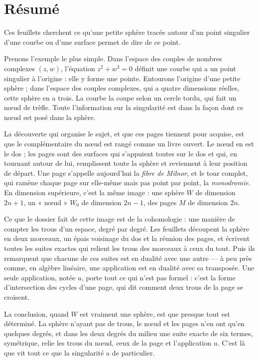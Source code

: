 \documentclass[11pt,a4paper]{article}
\begin{document}
\section*{Résumé}

\begin{resume}
Ces feuillets cherchent ce qu'une petite sphère tracée autour d'un point
singulier d'une courbe ou d'une surface permet de dire de ce point.

Prenons l'exemple le plus simple. Dans l'espace des couples de nombres
complexes $(z, w)$, l'équation $z^{2} + w^{3} = 0$ définit une courbe qui a un
point singulier à l'origine : elle y forme une pointe. Entourons l'origine
d'une petite sphère ; dans l'espace des couples complexes, qui a quatre
dimensions réelles, cette sphère en a trois. La courbe la coupe selon un
cercle tordu, qui fait un nœud de trèfle. Toute l'information sur la
singularité est dans la façon dont ce nœud est posé dans la sphère.

La découverte qui organise le sujet, et que ces pages tiennent pour acquise,
est que le complémentaire du nœud est rangé comme un livre ouvert. Le nœud en
est le dos ; les pages sont des surfaces qui s'appuient toutes sur le dos et
qui, en tournant autour de lui, remplissent toute la sphère et reviennent à
leur position de départ. Une page s'appelle aujourd'hui la \emph{fibre de
Milnor}, et le tour complet, qui ramène chaque page sur elle-même mais pas
point par point, la \emph{monodromie}. En dimension supérieure, c'est la même
image : une sphère $W$ de dimension $2n+1$, un « nœud » $W_0$ de dimension
$2n-1$, des pages $M$ de dimension $2n$.

Ce que le dossier fait de cette image est de la cohomologie : une manière de
compter les trous d'un espace, degré par degré. Les feuillets découpent la
sphère en deux morceaux, un épais voisinage du dos et la réunion des pages, et
écrivent toutes les suites exactes qui relient les trous des morceaux à ceux
du tout. Puis ils remarquent que chacune de ces suites est en dualité avec une
autre — à peu près comme, en algèbre linéaire, une application est en dualité
avec sa transposée. Une seule application, notée $u$, porte tout ce qui n'est
pas formel : c'est la forme d'intersection des cycles d'une page, qui dit
comment deux trous de la page se croisent.

La conclusion, quand $W$ est vraiment une sphère, est que presque tout est
déterminé. La sphère n'ayant pas de trous, le nœud et les pages n'en ont qu'en
quelques degrés, et dans les deux degrés du milieu une suite exacte de six
termes, symétrique, relie les trous du nœud, ceux de la page et
l'application $u$. C'est là que vit tout ce que la singularité a de
particulier.


\end{resume}
\end{document}
